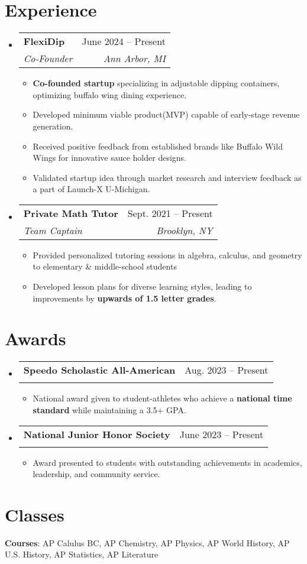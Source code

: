 \documentclass[letterpaper,11pt]{article}
\makeatletter
\newcommand{\resumeItem}[1]{
  \item\small{
    {#1 \vspace{-2pt}}
  }
}
\newcommand{\resumeSubheading}[4]{
  \vspace{-2pt}\item
    \begin{tabular*}{0.97\textwidth}[t]{l@{\extracolsep{\fill}}r}
      \textbf{#1} & #2 \\
      \textit{\small#3} & \textit{\small #4} \\
    \end{tabular*}\vspace{-7pt}
}
\newcommand{\resumeSubHeadingListStart}{\begin{itemize}[leftmargin=0.15in, label={}]}
\newcommand{\resumeSubHeadingListEnd}{\end{itemize}}
\newcommand{\resumeItemListStart}{\begin{itemize}}
\newcommand{\resumeItemListEnd}{\end{itemize}\vspace{-5pt}}
\makeatother
\begin{document}
\section{Experience}
  \resumeSubHeadingListStart

    \resumeSubheading
      {FlexiDip}{June 2024 -- Present}
      {Co-Founder}{Ann Arbor, MI}
      \resumeItemListStart
        \resumeItem{\textbf{Co-founded startup} specializing in adjustable dipping containers, optimizing buffalo wing dining experience.}
        \resumeItem{Developed minimum viable product(MVP) capable of early-stage revenue generation.}
        \resumeItem{Received positive feedback from established brands like Buffalo Wild Wings for innovative sauce holder designs.}
        \resumeItem{Validated startup idea through market research and interview feedback as a part of Launch-X U-Michigan.}
      \resumeItemListEnd
      
    \resumeSubheading
      {Private Math Tutor}{Sept. 2021 -- Present}
      {Team Captain}{Brooklyn, NY}
      \resumeItemListStart
        \resumeItem{Provided personalized tutoring sessions in algebra, calculus, and geometry to elementary \& middle-school students}
        \resumeItem{Developed lesson plans for diverse learning styles, leading to improvements by \textbf{upwards of 1.5 letter grades}.}
        \resumeItemListEnd

  \resumeSubHeadingListEnd


\section{Awards}
    \resumeSubHeadingListStart
      \resumeSubheading
      {Speedo Scholastic All-American}{Aug. 2023 -- Present}
      {}{}
      \resumeItemListStart
      \vspace{-4mm}
        \resumeItem{National award given to student-athletes who achieve a \textbf{national time standard }while maintaining a 3.5+ GPA.}
      \resumeItemListEnd
      
    \resumeSubheading
      {National Junior Honor Society}{June 2023 -- Present}
      {}{}
      \resumeItemListStart
      \vspace{-4mm}
        \resumeItem{Award presented to students with outstanding achievements in academics, leadership, and community service.}
      \resumeItemListEnd
    \resumeSubHeadingListEnd

\section{Classes}
 \begin{itemize}[leftmargin=0.15in, label={}]
    \small{\item{
    \vspace{1mm}
     \textbf{Courses}{: AP Calulus BC, AP Chemistry, AP Physics, AP World History, AP U.S. History, AP Statistics, AP Literature} \\

    }}
 \end{itemize}
\end{document}
